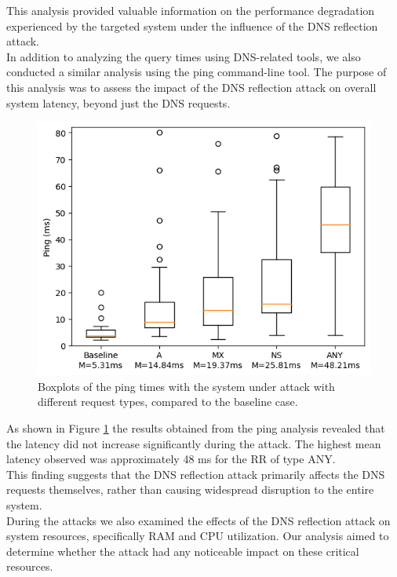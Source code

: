 This analysis provided valuable information on the performance degradation experienced by the targeted system under the influence of the DNS reflection attack.\\
In addition to analyzing the query times using DNS-related tools, we also conducted a similar analysis using the ping command-line tool. The purpose of this analysis was to assess the impact of the DNS reflection attack on overall system latency, beyond just the DNS requests.\\
\begin{figure}[H]
    \centering
    \includegraphics[width=\columnwidth]{Sections/Images/Boxplots_Ping.png}
    \caption{Boxplots of the ping times with the system under attack with different request types, compared to the baseline case.}
    \label{fig:Boxplots_Ping1}
\end{figure}
\noindent As shown in Figure \ref{fig:Boxplots_Ping1} the results obtained from the ping analysis revealed that the latency did not increase significantly during the attack. The highest mean latency observed was approximately 48 ms for the RR of type ANY. \\
This finding suggests that the DNS reflection attack primarily affects the DNS requests themselves, rather than causing widespread disruption to the entire system.\\
During the attacks we also examined the effects of the DNS reflection attack on system resources, specifically RAM and CPU utilization. Our analysis aimed to determine whether the attack had any noticeable impact on these critical resources.\\
